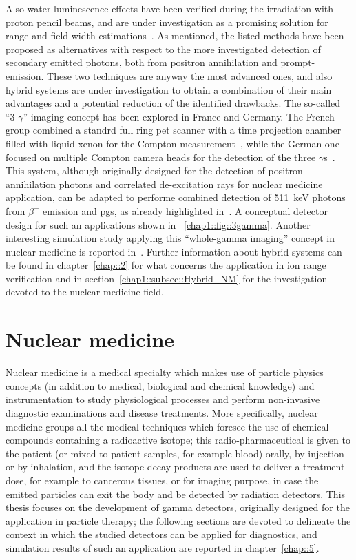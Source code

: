 Also water luminescence effects have been verified during the irradiation  with proton pencil beams, and are under investigation as a promising solution for range and field width estimations~\parencite{Komori2018}.   
As mentioned, the listed methods have been proposed as alternatives with respect to the more investigated detection of secondary emitted photons, both from positron annihilation and prompt-emission. These two techniques are anyway the most advanced ones, and also hybrid systems are under investigation to obtain a combination of their main advantages and a potential reduction of the identified drawbacks.  
The so-called \enquote{3-$\gamma$} imaging concept has been explored in France and Germany. The French group combined a standrd full ring \gls{pet} scanner with a time projection chamber filled with liquid xenon for the Compton measurement~\parencite{Oger2012}, while the German one focused on multiple Compton camera heads for the detection of the three $\gamma$s~\parencite{Lang2014}. This system, although originally designed for the detection of positron annihilation photons and correlated de-excitation rays for nuclear medicine application, can be adapted to performe combined detection of 511~keV photons from $\beta^+$ emission and \glspl{pg}, as already highlighted in~\parencite{Lang2014}. A conceptual detector design for such an applications shown in \figurename~\ref{chap1::fig::3gamma}. Another interesting simulation study applying this \enquote{whole-gamma imaging} concept in nuclear medicine is reported in~\parencite{Yamaya2017b}. 
Further information about hybrid systems can be found in chapter~\ref{chap::2} for what concerns the application in ion range verification and in section~\ref{chap1::subsec::Hybrid_NM} for the investigation devoted to the nuclear medicine field.

\newpage

\section{Nuclear medicine}\label{chap1::sec::NuclearMed}

Nuclear medicine is a medical specialty which makes use of particle physics concepts (in addition to medical, biological and chemical knowledge) and instrumentation to study physiological processes and perform non-invasive diagnostic examinations and disease treatments. More specifically, nuclear medicine groups all the medical techniques which foresee the use of chemical compounds containing a radioactive isotope; this radio-pharmaceutical is given to the patient (or mixed to patient samples, for example blood) orally, by injection or by inhalation, and the isotope decay products are used to deliver a treatment dose, for example to cancerous tissues, or for imaging purpose, in case the emitted particles can exit the body and be detected by radiation detectors. 
This thesis focuses on the development of gamma detectors, originally designed for the application in particle therapy; the following sections are devoted to delineate the context in which the studied detectors can be applied for diagnostics, and simulation results of such an application are reported in chapter~\ref{chap::5}.

